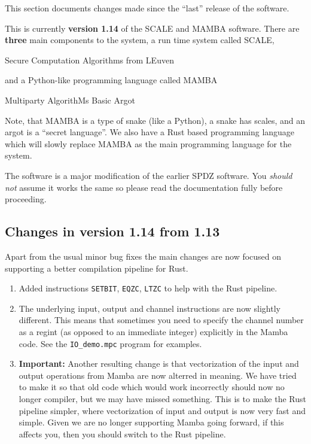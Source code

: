 
This section documents changes made since the ``last'' release of
the software.

\vspace{5mm}

\noindent
This is currently {\bf version 1.14} of the SCALE and MAMBA software.
There are {\bf three} main components to the system, a run time system called
SCALE,
\begin{center}
  Secure Computation Algorithms from LEuven
\end{center}
and a Python-like programming language called MAMBA
\begin{center}
  Multiparty AlgorithMs Basic Argot
\end{center}
Note, that MAMBA is a type of snake (like a Python), a snake
has scales, and an argot is a ``secret language''.
We also have a Rust based programming language which will slowly
replace MAMBA as the main programming language for the system.

\vspace{5mm}

\noindent
The software is a major modification of the earlier SPDZ software.
You {\em should not} assume it works the same so please read
the documentation fully before proceeding.

\subsection{Changes in version 1.14 from 1.13}
Apart from the usual minor bug fixes the main changes
are now focused on supporting a better compilation pipeline
for Rust.
\begin{enumerate}
\item Added instructions \verb+SETBIT+, \verb+EQZC+, \verb+LTZC+
	to help with the Rust pipeline.
\item The underlying input, output and channel instructions are now
	slightly different. This means that sometimes you need to
	specify the channel number as a regint (as opposed to an
	immediate integer) explicitly in the Mamba code. 
	See the \verb|IO_demo.mpc| program for examples.
\item {\bf Important:} Another resulting change is that vectorization of the input
	and output operations from Mamba are now alterred in meaning.
	We have tried to make it so that old code which would work
	incorrectly should now no longer compiler, but we may have
	missed something.
	This is to make the Rust pipeline simpler, where vectorization
	of input and output is now very fast and simple.
	Given we are no longer supporting Mamba going forward, if this
	affects you, then you should switch to the Rust pipeline.
\end{enumerate}

